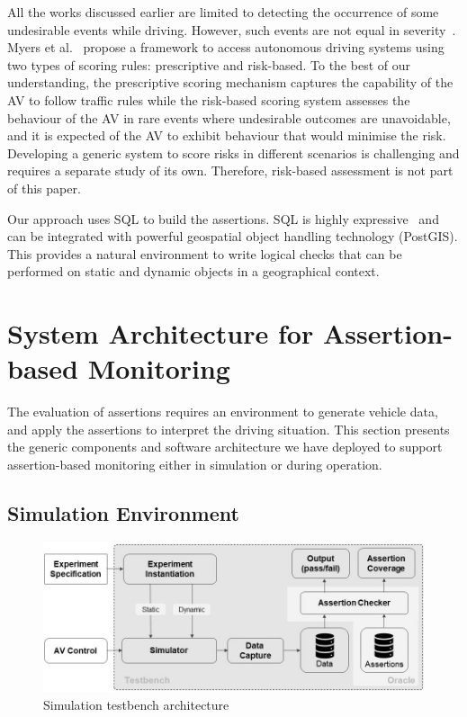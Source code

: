 All the works discussed earlier are limited to detecting the occurrence of some undesirable events while driving. However, such events are not equal in severity~\cite{sinha}. Myers et al.~\cite{myers} propose a framework to access autonomous driving systems using two types of scoring rules: prescriptive and risk-based. To the best of our understanding, the prescriptive scoring mechanism captures the capability of the AV to follow traffic rules while the risk-based scoring system assesses the behaviour of the AV in rare events where undesirable outcomes are unavoidable, and it is expected of the AV to exhibit behaviour that would minimise the risk. Developing a generic system to score risks in different scenarios is challenging and requires a separate study of its own. Therefore, risk-based assessment is not part of this paper.

Our approach uses SQL to build the assertions. SQL is highly expressive~\cite{sqllibkin} and can be integrated with powerful geospatial object handling technology (PostGIS). This provides a natural environment to write logical checks that can be performed on static and dynamic objects in a geographical context. 
%



\section{System Architecture for Assertion-based Monitoring} \label{generic_architecture}

The evaluation of assertions requires an environment to generate vehicle data, and apply the assertions to interpret the driving situation. This section presents the generic components and software architecture we have deployed to support assertion-based monitoring either in simulation or during operation.

\subsection{Simulation Environment} \label{generic_sim_system}

\begin{figure}[!ht]
    \centering
    \includegraphics[width=0.98\linewidth]{../other/figures/SimulatorAssertionsTestBenchArchitecture.jpg}
    \caption{Simulation testbench architecture}
    \label{fig:SimulatorArchitecture}
\end{figure}


